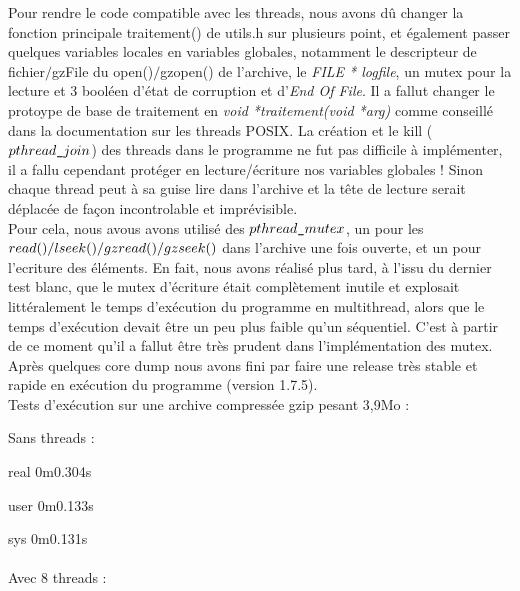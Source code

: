 \documentclass[12pt, a4paper]{report}
\begin{document}
\hspace{0.5cm}Pour rendre le code compatible avec les threads, nous avons dû changer la fonction principale traitement() de utils.h sur plusieurs point, et également passer quelques variables locales en variables globales, notamment le descripteur de fichier$/$gzFile du open()$/$gzopen() de l'archive, le \textit{FILE * logfile}, un mutex pour la lecture et 3 booléen d'état de corruption et d'\textit{End Of File}. Il a fallut changer le protoype de base de traitement en \textit{void *traitement(void *arg)} comme conseillé dans la documentation sur les threads POSIX. La création et le kill ($pthread\verb|_|join$) des threads dans le programme ne fut pas difficile à implémenter, il a fallu cependant protéger en lecture/écriture nos variables globales ! Sinon chaque thread peut à sa guise lire dans l'archive et la tête de lecture serait déplacée de façon incontrolable et imprévisible. \\

\hspace{0.5cm}Pour cela, nous avous avons utilisé des $pthread\verb|_|mutex$, un pour les $read()/lseek()\\
/gzread()/gzseek()$ dans l'archive une fois ouverte, et un pour l'ecriture des éléments. En fait, nous avons réalisé plus tard, à l'issu du dernier test blanc, que le mutex d'écriture était complètement inutile et explosait littéralement le temps d'exécution du programme en multithread, alors que le temps d'exécution devait être un peu plus faible qu'un séquentiel. C'est à partir de ce moment qu'il a fallut être très prudent dans l'implémentation des mutex. Après quelques core dump nous avons fini par faire une release très stable et rapide en exécution du programme (version 1.7.5).\\

\hspace{0.5cm}Tests d'exécution sur une archive compressée gzip pesant 3,9Mo :

\hspace{1.0cm}Sans threads :

\hspace{1.5cm}	real	0m0.304s

\hspace{1.5cm}	user	0m0.133s

\hspace{1.5cm}	sys	0m0.131s
\\
\\

\hspace{1.cm}Avec 8 threads :
\end{document}
